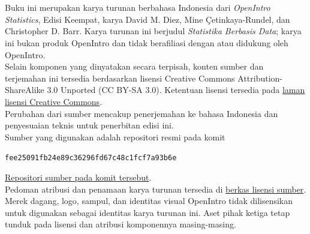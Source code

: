 \chapter*{}
\vfill


\noindent
Buku ini merupakan karya turunan berbahasa Indonesia dari
\emph{OpenIntro Statistics}, Edisi Keempat, karya David M. Diez,
Mine \c{C}etinkaya-Rundel, dan Christopher D. Barr. Karya turunan ini
berjudul \emph{Statistika Berbasis Data}; karya ini bukan produk OpenIntro
dan tidak berafiliasi dengan atau didukung oleh OpenIntro. \\

\noindent
Selain komponen yang dinyatakan secara terpisah, konten sumber dan terjemahan
ini tersedia berdasarkan lisensi
Creative Commons Attribution-ShareAlike 3.0 Unported (CC BY-SA 3.0).
Ketentuan lisensi tersedia pada
\href{https://creativecommons.org/licenses/by-sa/3.0/}{laman lisensi Creative Commons}. \\

\noindent
Perubahan dari sumber mencakup penerjemahan ke bahasa Indonesia dan
penyesuaian teknis untuk penerbitan edisi ini. \\

\noindent
Sumber yang digunakan adalah repositori resmi pada komit
\begin{center}
\small\texttt{fee25091fb24e89c36296fd67c48c1fcf7a93b6e}
\end{center}
\href{https://github.com/OpenIntroStat/openintro-statistics/tree/fee25091fb24e89c36296fd67c48c1fcf7a93b6e}{Repositori sumber pada komit tersebut}. \\

\noindent
Pedoman atribusi dan penamaan karya turunan tersedia di
\href{https://github.com/OpenIntroStat/openintro-statistics/blob/fee25091fb24e89c36296fd67c48c1fcf7a93b6e/LICENSE.md}{berkas lisensi sumber}.
Merek dagang, logo, sampul, dan identitas visual OpenIntro tidak dilisensikan
untuk digunakan sebagai identitas karya turunan ini. Aset pihak ketiga tetap
tunduk pada lisensi dan atribusi komponennya masing-masing.
